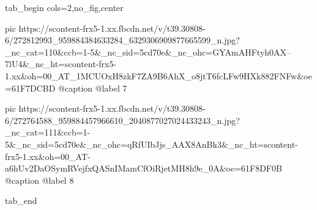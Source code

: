  
 
 
 
 


\ifcmt
  tab_begin cols=2,no_fig,center

     pic https://scontent-frx5-1.xx.fbcdn.net/v/t39.30808-6/272812993_959884384633284_6329306909877665599_n.jpg?_nc_cat=110&ccb=1-5&_nc_sid=5cd70e&_nc_ohc=GYAmAHFtyh0AX--7lU4&_nc_ht=scontent-frx5-1.xx&oh=00_AT_1MCUOxH8zkF7ZA9B6AhX_o8jtT6fcLFw9HXk882FNFw&oe=61F7DCBD
     @caption @label 7

     pic https://scontent-frx5-1.xx.fbcdn.net/v/t39.30808-6/272764588_959884457966610_2040877027024433243_n.jpg?_nc_cat=111&ccb=1-5&_nc_sid=5cd70e&_nc_ohc=qRfUIbJjs_AAX8AnBk3&_nc_ht=scontent-frx5-1.xx&oh=00_AT-a6hUv2DaOSymRVejfxQASnIMamCfOiRjetMH8h9e_0A&oe=61F8DF0B
     @caption @label 8

  tab_end
\fi
